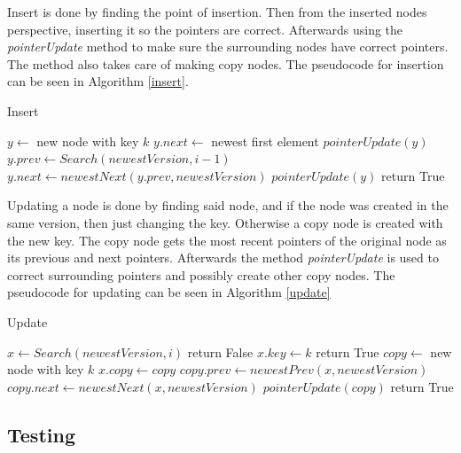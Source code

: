 \documentclass[12pt, a4paper]{article}
\begin{document}
\medskip
Insert is done by finding the point of insertion. Then from the inserted 
nodes perspective, inserting it so the pointers are correct. Afterwards 
using the {\it pointerUpdate} method to make sure the surrounding nodes have 
correct pointers. The method also takes care of making copy nodes. The 
pseudocode for insertion can be seen in Algorithm \ref{insert}.

\begin{algorithm}
\caption{Insert}\label{insert}
\begin{algorithmic}[1]
    \State $y \gets$ new node with key $k$
        \State $y.next \gets$ newest first element
        \State $pointerUpdate(y)$
    \Else
        \State $y.prev \gets Search(newestVersion, i-1)$
        \State $y.next \gets newestNext(y.prev, newestVersion)$
        \State $pointerUpdate(y)$
    \EndIf
    \State return True
\EndProcedure
\end{algorithmic}
\end{algorithm}

\medskip
Updating a node is done by finding said node, and if the node was created in
the same version, then just changing the key. Otherwise a copy node is created
with the new key. The copy node gets the most recent pointers of the original node
as its previous and next pointers. Afterwards the method {\it pointerUpdate} is used
to correct surrounding pointers and possibly create other copy nodes. 
The pseudocode for updating can be seen in Algorithm \ref{update}

\begin{algorithm}
\caption{Update}\label{update}
\begin{algorithmic}[1]
    \State $x \gets Search(newestVersion, i)$
        \State return False
    \endIf
        \State $x.key \gets k$
        \State return True
    \EndIf
    \State $copy \gets$ new node with key $k$
    \State $x.copy \gets copy$
    \State $copy.prev \gets newestPrev(x, newestVersion)$
    \State $copy.next \gets newestNext(x, newestVersion)$
    \State $pointerUpdate(copy)$
    \State return True
\EndProcedure
\end{algorithmic}
\end{algorithm}

\subsection*{Testing}
\end{document}
